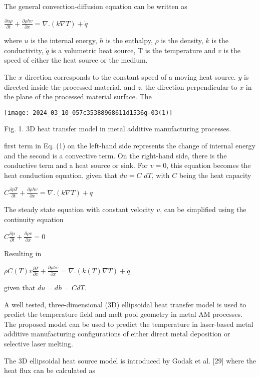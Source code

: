 \documentclass[10pt]{article}
\begin{document}
The general convection-diffusion equation can be written as

$\frac{\partial u \rho}{\partial t}+\frac{\partial \rho h v}{\partial x}=\nabla .(k \nabla T)+\dot{q}$

where $u$ is the internal energy, $h$ is the enthalpy, $\rho$ is the density, $k$ is the conductivity, $\dot{q}$ is a volumetric heat source, $\mathrm{T}$ is the temperature and $v$ is the speed of either the heat source or the medium.

The $x$ direction corresponds to the constant speed of a moving heat source. $y$ is directed inside the processed material, and $z$, the direction perpendicular to $x$ in the plane of the processed material surface. The

\begin{center}
\texttt{[image: 2024\_03\_10\_057c35388968611d1536g-03(1)]}
\end{center}

Fig. 1. 3D heat transfer model in metal additive manufacturing processes.

first term in Eq. (1) on the left-hand side represents the change of internal energy and the second is a convective term. On the right-hand side, there is the conductive term and a heat source or sink. For $v=0$, this equation becomes the heat conduction equation, given that $d u=C$ $d T$, with $C$ being the heat capacity

$C \frac{\partial \rho T}{\partial t}+\frac{\partial \rho h v}{\partial x}=\nabla .(k \nabla T)+\dot{q}$

The steady state equation with constant velocity $v$, can be simplified using the continuity equation

$C \frac{\partial \rho}{\partial t}+\frac{\partial \rho v}{\partial x}=0$

Resulting in

$\rho C(T) v \frac{\partial T}{\partial x}+\frac{\partial \rho h v}{\partial x}=\nabla .(k(T) \nabla T)+\dot{q}$

given that $d u=d h=C d T$.

A well tested, three-dimensional (3D) ellipsoidal heat transfer model is used to predict the temperature field and melt pool geometry in metal AM processes. The proposed model can be used to predict the temperature in laser-based metal additive manufacturing configurations of either direct metal deposition or selective laser melting.

The 3D ellipsoidal heat source model is introduced by Godak et al. [29] where the heat flux can be calculated as
\end{document}
